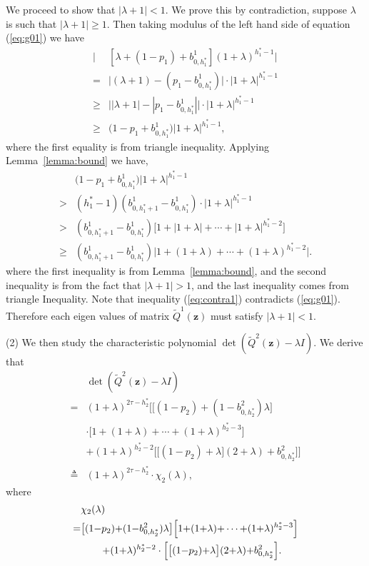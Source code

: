 \documentclass[11pt,twocolumn]{IEEEtran}
\begin{document}
We proceed to show that $\big|\lambda+1\big|<1$. We prove this by contradiction, suppose $\lambda$ is such that $\big|\lambda+1\big|\geq 1$. Then taking modulus of the left hand side of equation (\ref{eq:g01}) we have
\begin{align}
\big| &[\lambda{+}(1{-}p_1){+}b_{0,h^*_1}^1](1{+}\lambda)^{h^*_1{-}1}\big|\nonumber\\
=& \big|(\lambda+1)-(p_1-b^1_{0,h^*_1})\big| \cdot \big| 1+\lambda\big|^{h^*_1-1} \nonumber \\
\geq& \big||\lambda+1|-|p_1-b^1_{0,h^*_1}|\big|\cdot \big| 1+\lambda\big|^{h^*_1-1} \nonumber \\
\geq& \Big(1 - p_1 + b^1_{0,h^*_1}\Big) \big| 1+\lambda\big|^{h^*_1-1}, \nonumber
\end{align}
where the first equality is from triangle inequality. Applying Lemma~\ref{lemma:bound} we have,
\begin{align}
&\Big(1 - p_1 + b^1_{0,h^*_1}\Big) \big| 1+\lambda\big|^{h^*_1-1} \nonumber \\
>&(h^*_1-1)(b^1_{0,h^*_1+1}-b^1_{0,h^*_1}) \cdot \big| 1+\lambda\big|^{h^*_1-1} \nonumber \\
>&(b^1_{0,h^*_1+1}-b^1_{0,h^*_1})\big[1+\big| 1+\lambda\big|+\cdots+\big| 1+\lambda\big|^{h^*_1-2}\big] \nonumber \\
\geq & (b^1_{0,h^*_1+1}-b^1_{0,h^*_1}) \big| 1{+}(1{+}\lambda){+}\cdots{+}(1{+}\lambda)^{h^*_1{-}2} \big|. \label{eq:contra1}
\end{align}
where the first inequality is from Lemma~\ref{lemma:bound}, and the second inequality is from the fact that $\big|\lambda+1\big|{>}1$, and the last inequality comes from triangle Inequality. Note that inequality (\ref{eq:contra1}) contradicts (\ref{eq:g01}). Therefore each eigen values of matrix $\tilde{Q}^1(\bm z)$ must satisfy $\big|\lambda+1\big|< 1$.
\vspace{8pt}

(2) We then study the characteristic polynomial $\det (\tilde{Q}^2(\bm z)-\lambda I)$. We derive that
\begin{align}
&\det (\tilde{Q}^2(\bm z)-\lambda I) \nonumber\\
=& (1+\lambda)^{2\tau-h^*_2} \Big[\big[(1-p_2)+(1-b_{0, h^*_2}^2)\lambda \big]\nonumber\\
&\cdot\Big[1+(1+\lambda)+\cdots + (1+\lambda)^{h^*_2-3} \Big]\nonumber \\
& +(1+\lambda)^{h^*_2-2}\Big[\big[(1-p_2)+\lambda \big](2+\lambda)+ b_{0, h^*_2}^2 \Big] \Big] \nonumber \\
\triangleq & (1+\lambda)^{2\tau-h^*_2} \cdot \chi_2(\lambda), \label{eq:Q2zero}
\end{align}
where
\begin{align}
&\chi_2(\lambda)\nonumber\\
{=}&\big[(1{-}p_2){+}(1{-}b_{0, h^*_2}^2)\lambda \big]\Big[1{+}(1{+}\lambda){+}\cdots {+} (1{+}\lambda)^{h^*_2{-}3} \Big] \nonumber\\
&\hspace{0.3in}{+}(1{+}\lambda)^{h^*_2{-}2}\cdot\Big[\big[(1{-}p_2){+}\lambda \big](2{+}\lambda){+} b_{0, h^*_2}^2\Big].\nonumber
\end{align}
\end{document}
